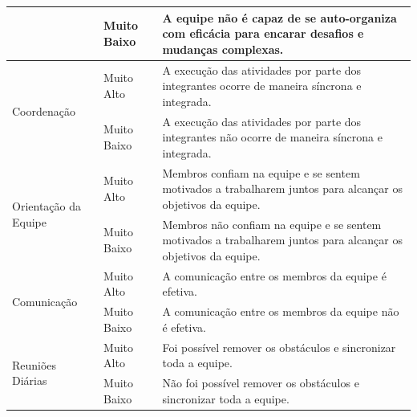\begin{center}
\begin{longtable}{
|p{0.30\dimexpr \textwidth-3\arrayrulewidth-3\tabcolsep\relax}|
 p{0.08\dimexpr \textwidth-3\arrayrulewidth-3\tabcolsep\relax}|
 p{0.62\dimexpr \textwidth-3\arrayrulewidth-3\tabcolsep\relax}|
}
                                              & Muito Baixo & A equipe não é capaz de se auto-organiza com eficácia para encarar desafios e mudanças complexas.                                                                                     \\ \hline
\multirow{2}{*}{Coordenação}                  & Muito Alto  & A execução das atividades por parte dos integrantes ocorre de maneira síncrona e integrada.                                                                                           \\ \cline{2-3}
                                              & Muito Baixo & A execução das atividades por parte dos integrantes não ocorre de maneira síncrona e integrada.                                                                                       \\ \hline
\multirow{2}{*}{Orientação da Equipe}         & Muito Alto  & Membros confiam na equipe e se sentem motivados a trabalharem juntos para alcançar os objetivos da equipe.                                                                            \\ \cline{2-3}
                                              & Muito Baixo & Membros não confiam na equipe e se sentem motivados a trabalharem juntos para alcançar os objetivos da equipe.                                                                        \\ \hline
\multirow{2}{*}{Comunicação}                  & Muito Alto  & A comunicação entre os membros da equipe é efetiva.                                                                                                                                   \\ \cline{2-3}
                                              & Muito Baixo & A comunicação entre os membros da equipe não é efetiva.                                                                                                                               \\ \hline
\multirow{2}{*}{Reuniões Diárias}             & Muito Alto  & Foi possível remover os obstáculos e sincronizar toda a equipe.                                                                                                                       \\ \cline{2-3}
                                              & Muito Baixo & Não foi possível remover os obstáculos e sincronizar toda a equipe.                                                                                                                   \\ \hline

\end{longtable}
\end{center}
